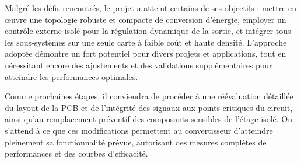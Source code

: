 Malgré les défis rencontrés, le projet a atteint certains de ses objectifs : mettre en œuvre une topologie robuste et compacte de conversion d'énergie, employer un contrôle externe isolé pour la régulation dynamique de la sortie, et intégrer tous les sous-systèmes sur une seule carte à faible coût et haute densité. L'approche adoptée démontre un fort potentiel pour divers projets et applications, tout en nécessitant encore des ajustements et des validations supplémentaires pour atteindre les performances optimales.

Comme prochaines étapes, il conviendra de procéder à une réévaluation détaillée du layout de la PCB et de l'intégrité des signaux aux points critiques du circuit, ainsi qu'au remplacement préventif des composants sensibles de l'étage isolé. On s'attend à ce que ces modifications permettent au convertisseur d'atteindre pleinement sa fonctionnalité prévue, autorisant des mesures complètes de performances et des courbes d'efficacité.
